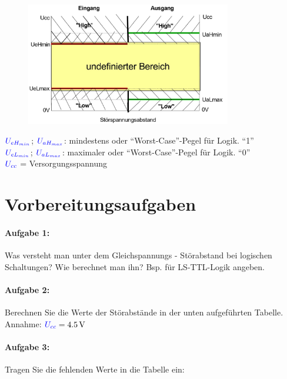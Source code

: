 \documentclass[11pt,a4paper,titlepage,parskip=half]{scrreprt}
\begin{document}
    \begin{figure}[H]
      \begin{center}
        \includegraphics[width=0.8\textwidth]{./1_1_Z1.jpg}
      \end{center}
    \end{figure}

    $\textcolor{blue}{U_{eH_{min}}}$; $\textcolor{blue}{U_{aH_{max}}}$: mindestens oder "`Worst-Case"'-Pegel für Logik. "`1"'\\
    $\textcolor{blue}{U_{eL_{min}}}$; $\textcolor{blue}{U_{aL_{max}}}$: maximaler oder "`Worst-Case"'-Pegel für Logik. "`0"'\\
    $\textcolor{blue}{U_{cc}}$ = Versorgungsspannung\\

    \section{Vorbereitungsaufgaben}

      \paragraph{Aufgabe 1:} Was versteht man unter dem Gleichspannungs - Störabstand bei logischen Schaltungen? Wie berechnet man ihn? Bsp. für LS-TTL-Logik angeben.

      

      \paragraph{Aufgabe 2:} Berechnen Sie die Werte der Störabstände in der unten aufgeführten Tabelle.\\
        Annahme: $\textcolor{blue}{U_{cc}} = \SI{4,5}{\volt}$

      \paragraph{Aufgabe 3:} Tragen Sie die fehlenden Werte in die Tabelle ein:
\end{document}
